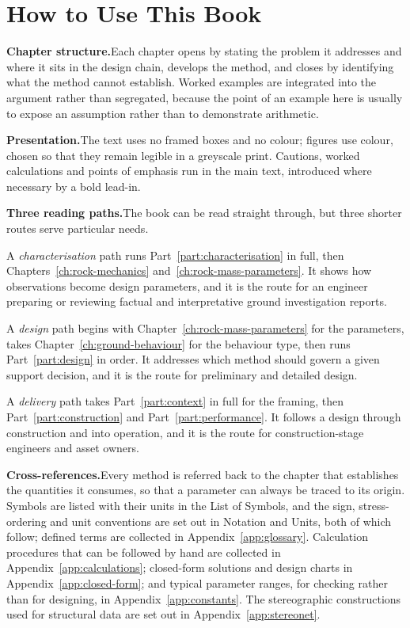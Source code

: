 \chapter*{How to Use This Book}
{}
\label{ch:how-to-use}

\noindent\textbf{Chapter structure.}\enspace Each chapter opens by stating the
problem it addresses and where it sits in the design chain, develops the
method, and closes by identifying what the method cannot establish. Worked
examples are integrated into the argument rather than segregated, because the
point of an example here is usually to expose an assumption rather than to
demonstrate arithmetic.

\noindent\textbf{Presentation.}\enspace The text uses no framed boxes and no
colour; figures use colour, chosen so that they remain legible in a greyscale
print. Cautions, worked calculations and points of emphasis run in the main
text, introduced where necessary by a bold lead-in.

\noindent\textbf{Three reading paths.}\enspace The book can be read straight
through, but three shorter routes serve particular needs.

A \emph{characterisation} path runs Part~\ref{part:characterisation} in full,
then Chapters~\ref{ch:rock-mechanics} and~\ref{ch:rock-mass-parameters}. It
shows how observations become design parameters, and it is
the route for an engineer preparing or reviewing factual and interpretative
ground investigation reports.

A \emph{design} path begins with Chapter~\ref{ch:rock-mass-parameters} for the
parameters, takes Chapter~\ref{ch:ground-behaviour} for the behaviour type,
then runs Part~\ref{part:design} in order. It addresses which
method should govern a given support decision, and it is the route for
preliminary and detailed design.

A \emph{delivery} path takes Part~\ref{part:context} in full for the framing,
then
Part~\ref{part:construction} and Part~\ref{part:performance}. It follows a
design through construction and into operation, and it is the
route for construction-stage engineers and asset owners.

\noindent\textbf{Cross-references.}\enspace Every method is referred back to
the chapter that establishes the quantities it consumes, so that a parameter
can always be traced to its origin. Symbols are listed with their units in
the List of Symbols, and the sign, stress-ordering and unit conventions are
set out in Notation and Units, both of which follow; defined terms are
collected in Appendix~\ref{app:glossary}. Calculation procedures that can be
followed by hand are collected in Appendix~\ref{app:calculations}; closed-form
solutions and design charts in Appendix~\ref{app:closed-form}; and typical
parameter ranges, for checking rather than for designing, in
Appendix~\ref{app:constants}. The stereographic constructions used for
structural data are set out in Appendix~\ref{app:stereonet}.

